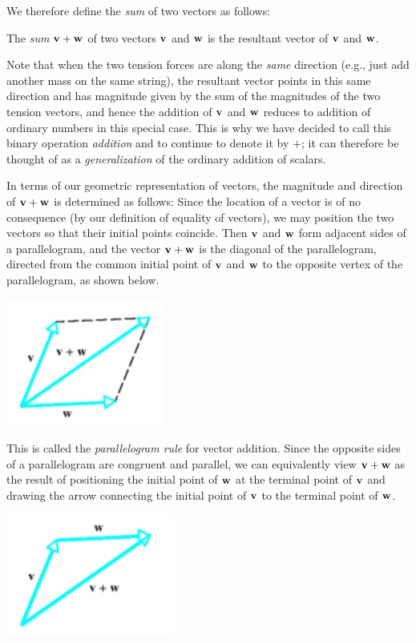 \documentclass[12pt,letterpaper,reqno]{article}
\numberwithin{equation}{section}
\newcommand{\ti}[1]{\textit{#1}}
\begin{document}
 We therefore define the \emph{sum} of two vectors as follows:
 
 \begin{defn}
 	The \ti{sum} ${\bf v}+{\bf w}$ of two vectors ${\bf v}$ and ${\bf w}$ is the resultant vector of ${\bf v}$ and ${\bf w}$.
 \end{defn}
Note that when the two tension forces are along the \emph{same} direction (e.g., just add another mass on the same string), the resultant vector points in this same direction and has magnitude given by the sum of the magnitudes of the two tension vectors, and hence the addition of ${\bf v}$ and ${\bf w}$ reduces to addition of ordinary numbers in this special case. This is why we have decided to call this binary operation \emph{addition} and to continue to denote it by $+$; it can therefore be thought of as a \emph{generalization} of the ordinary addition of scalars. 
 
In terms of our geometric representation of vectors, the magnitude and direction of ${\bf v}+{\bf w}$ is determined as follows: Since the location of a vector is of no consequence (by our definition of equality of vectors), we may position the two vectors so that their initial points coincide. Then ${\bf v}$ and ${\bf w}$ form adjacent sides of a parallelogram, and the vector ${\bf v}+{\bf w}$ is the diagonal of the parallelogram, directed from the common initial point of ${\bf v}$ and ${\bf w}$ to the opposite vertex of the parallelogram, as shown below.	
\begin{center}
	\includegraphics[scale=0.5]{figures_mvc/parallelogram_rule}
\end{center}
This is called the \ti{parallelogram rule} for vector addition. Since the opposite sides of a parallelogram are congruent and parallel, we can equivalently view ${\bf v}+{\bf w}$ as the result of positioning the initial point of ${\bf w}$ at the terminal point of ${\bf v}$ and drawing the arrow connecting the initial point of ${\bf v}$ to the terminal point of ${\bf w}$.

	\begin{center}
	\includegraphics[scale=0.5]{figures_mvc/tip_to_tail}
\end{center}
\end{document}
